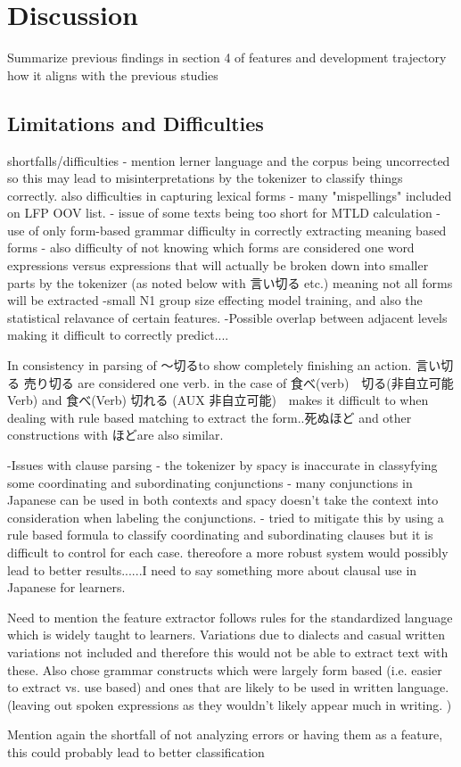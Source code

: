 \section{Discussion}
Summarize previous findings in section 4 of features and development trajectory how it aligns with the previous studies




\subsection{Limitations and Difficulties}
shortfalls/difficulties
- mention lerner language and the corpus being uncorrected so this may lead to misinterpretations by the tokenizer to classify things correctly.
    also difficulties in capturing lexical forms - many "mispellings" included on LFP OOV list.
- issue of some texts being too short for MTLD calculation
- use of only form-based grammar difficulty in correctly extracting meaning based forms
- also difficulty of not knowing which forms are considered one word expressions versus expressions that will
actually be broken down into smaller parts by the tokenizer (as noted below with 言い切る etc.) meaning not all forms
will be extracted
-small N1 group size effecting model training, and also the statistical relavance of certain features.
-Possible overlap between adjacent levels making it difficult to correctly predict....

In consistency in parsing of 〜切るto show completely finishing an action. 言い切る 売り切る are considered one verb. in the
case of 食べ(verb)　切る(非自立可能Verb) and 食べ(Verb) 切れる (AUX 非自立可能)　makes it difficult to when dealing with rule based
matching to extract the form..死ぬほど and other constructions with ほどare also similar.

-Issues with clause parsing - the tokenizer by spacy is inaccurate in classyfying some coordinating and
subordinating conjunctions - many conjunctions in Japanese can be used in both contexts and spacy doesn't take the
context into consideration when labeling the conjunctions. - tried to mitigate this by using a rule based formula to
classify coordinating and subordinating clauses but it is difficult to control for each case. thereofore a more
robust system would possibly lead to better results......I need to say something more about clausal use in Japanese
for learners.


Need to mention the feature extractor follows rules for the standardized language which is widely taught to
learners. Variations due to dialects and casual written variations not included and therefore this would not be
able to extract text with these. Also chose grammar constructs which were largely form based (i.e. easier to extract
vs. use based) and ones that are likely to be used in written language. (leaving out spoken expressions as they
wouldn't likely appear much in writing. )

Mention again the shortfall of not analyzing errors or having them as a feature, this could probably lead to better
classification